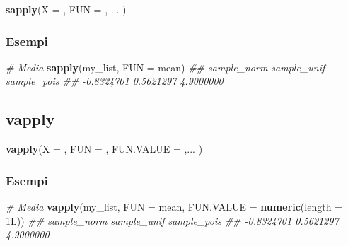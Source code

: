 \documentclass[
]{book}
\newenvironment{Shaded}{\begin{snugshade}}{\end{snugshade}}
\newcommand{\CommentTok}[1]{\textcolor[rgb]{0.56,0.35,0.01}{\textit{#1}}}
\newcommand{\DataTypeTok}[1]{\textcolor[rgb]{0.13,0.29,0.53}{#1}}
\newcommand{\KeywordTok}[1]{\textcolor[rgb]{0.13,0.29,0.53}{\textbf{#1}}}
\newcommand{\NormalTok}[1]{#1}
\begin{document}
\begin{Shaded}
\begin{Highlighting}[]
\KeywordTok{sapply}\NormalTok{(}\DataTypeTok{X =}\NormalTok{ , }\DataTypeTok{FUN =}\NormalTok{ , ... )}
\end{Highlighting}
\end{Shaded}

\hypertarget{esempi-3}{%
\subsubsection*{Esempi}\label{esempi-3}}

\begin{Shaded}
\begin{Highlighting}[]
\CommentTok{# Media }
\KeywordTok{sapply}\NormalTok{(my_list, }\DataTypeTok{FUN =}\NormalTok{ mean)}
\CommentTok{## sample_norm sample_unif sample_pois }
\CommentTok{##  -0.8324701   0.5621297   4.9000000}
\end{Highlighting}
\end{Shaded}

\hypertarget{vapply}{%
\subsection{vapply}\label{vapply}}

\begin{Shaded}
\begin{Highlighting}[]
\KeywordTok{vapply}\NormalTok{(}\DataTypeTok{X =}\NormalTok{ , }\DataTypeTok{FUN =}\NormalTok{ , }\DataTypeTok{FUN.VALUE =}\NormalTok{  ,... )}
\end{Highlighting}
\end{Shaded}

\hypertarget{esempi-4}{%
\subsubsection*{Esempi}\label{esempi-4}}

\begin{Shaded}
\begin{Highlighting}[]
\CommentTok{# Media }
\KeywordTok{vapply}\NormalTok{(my_list, }\DataTypeTok{FUN =}\NormalTok{ mean, }\DataTypeTok{FUN.VALUE =} \KeywordTok{numeric}\NormalTok{(}\DataTypeTok{length =}\NormalTok{ 1L))}
\CommentTok{## sample_norm sample_unif sample_pois }
\CommentTok{##  -0.8324701   0.5621297   4.9000000}
\end{Highlighting}
\end{Shaded}
\end{document}

